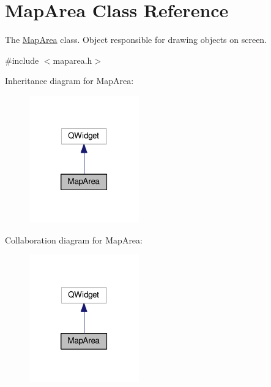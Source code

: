 \hypertarget{classMapArea}{\section{Map\-Area Class Reference}
\label{classMapArea}
}


The \hyperlink{classMapArea}{Map\-Area} class. Object responsible for drawing objects on screen.  




{\ttfamily \#include $<$maparea.\-h$>$}



Inheritance diagram for Map\-Area\-:
\nopagebreak
\begin{figure}[H]
\begin{center}
\leavevmode
\includegraphics[width=134pt]{classMapArea__inherit__graph}
\end{center}
\end{figure}


Collaboration diagram for Map\-Area\-:
\nopagebreak
\begin{figure}[H]
\begin{center}
\leavevmode
\includegraphics[width=134pt]{classMapArea__coll__graph}
\end{center}
\end{figure}
